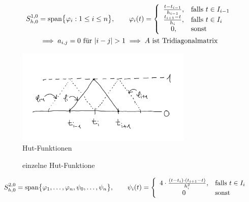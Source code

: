 \begin{align*}
S^{1,0}_{h,0}&=\text{span}\big\lbrace\varphi_i:1\leq i\leq n\big\rbrace,\qquad
\varphi_i(t)=\left\lbrace\begin{array}{cl}
\frac{t-t_{i-1}}{h_{i-1}}, &\falls t\in I_{i-1}\\
\frac{t_{i+1}-t}{h_i}, &\falls t\in I_i\\
0, &\sonst
\end{array}\right.\\
&\implies a_{i,j}=0\text{ für }|i-j|>1\implies A\text{ ist Tridiagonalmatrix}
\end{align*}

\begin{figure}[h!]
	\begin{center}
		\includegraphics[width=0.75\textwidth]{./pics/Sketch1.png}
		\caption{Hut-Funktionen}
		\label{AbbHutFunktionen}
	\end{center}
\end{figure}

\begin{figure}[h!]
\begin{center}

\caption{einzelne Hut-Funktione}
\label{AbbPhiHat}
\end{center}
\end{figure}

\begin{align*}
S_{h,0}^{2,0}&=\text{span}\big\lbrace\varphi_1,\ldots,\varphi_n,\psi_0,\ldots,\psi_n\big\rbrace,\qquad
\psi_i(t)=\left\lbrace\begin{array}{cl}
4\cdot\frac{(t-t_i)\cdot(t_{i+1}-t)}{h_i^2}, &\text{falls } t\in I_i\\
0 &\text{sonst }
\end{array}\right.
\end{align*}

